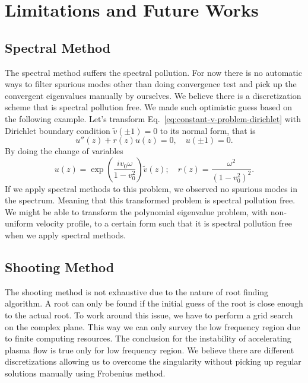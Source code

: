 \section{Limitations and Future Works}
\subsection{Spectral Method}
The spectral method suffers the spectral pollution. For now there is no automatic ways to filter spurious modes other than doing convergence test and pick up the convergent eigenvalues manually by ourselves. We believe there is a discretization scheme that is spectral pollution free. We made such optimistic guess based on the following example. Let's transform Eq.~\ref{eq:constant-v-problem-dirichlet} with Dirichlet boundary condition $\tilde{v}(\pm 1) = 0$ to its normal form, that is
\begin{equation}
	u''(z) + r(z)u(z) = 0, \quad u(\pm 1) = 0.
\end{equation}
By doing the change of variables
\begin{equation}
	u(z) = \exp\left(\frac{iv_0\omega}{1-v_0^2}\right)\tilde{v}(z); \quad
	r(z) = \frac{\omega^2}{(1-v_0^2)^2}.
\end{equation}
If we apply spectral methods to this problem, we observed no spurious modes in the spectrum. Meaning that this transformed problem is spectral pollution free. We might be able to transform the polynomial eigenvalue problem, with non-uniform velocity profile, to a certain form such that it is spectral pollution free when we apply spectral methods.

\subsection{Shooting Method}
The shooting method is not exhaustive due to the nature of root finding algorithm. A root can only be found if the initial guess of the root is close enough to the actual root. To work around this issue, we have to perform a grid search on the complex plane. This way we can only survey the low frequency region due to finite computing resources. The conclusion for the instability of accelerating plasma flow is true only for low frequency region. We believe there are different discretizations allowing us to overcome the singularity without picking up regular solutions manually using Frobenius method.

